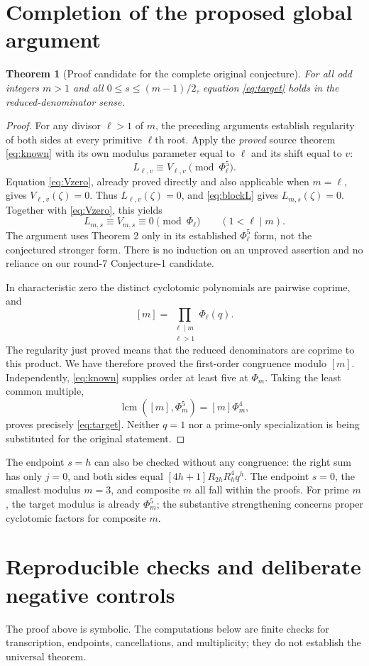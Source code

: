 \documentclass[11pt,a4paper]{article}
\newtheorem{theorem}{Theorem}[section]
\newcommand{\ph}{\Phi}\newcommand{\ord}{\operatorname{ord}}
\begin{document}
\section{Completion of the proposed global argument}
\begin{theorem}[Proof candidate for the complete original conjecture]
For all odd integers $m>1$ and all $0\leq s\leq(m-1)/2$,
equation \eqref{eq:target} holds in the reduced-denominator sense.
\end{theorem}
\begin{proof}
For any divisor $\ell>1$ of $m$, the preceding arguments establish
regularity of both sides at every primitive $\ell$th root.
Apply the \emph{proved} source theorem \eqref{eq:known} with its own
modulus parameter equal to $\ell$ and its shift equal to $v$:
\[
 L_{\ell,v}\equiv V_{\ell,v}\pmod{\ph_\ell^5}.
\]
Equation \eqref{eq:Vzero}, already proved directly and also applicable
when $m=\ell$, gives $V_{\ell,v}(\zeta)=0$. Thus
$L_{\ell,v}(\zeta)=0$, and \eqref{eq:blockL} gives
$L_{m,s}(\zeta)=0$. Together with \eqref{eq:Vzero}, this yields
\[
 L_{m,s}\equiv V_{m,s}\equiv0\pmod{\ph_\ell}
 \qquad(1<\ell\mid m).
\]
The argument uses Theorem 2 only in its established $\ph_\ell^5$ form,
not the conjectured stronger form. There is no induction on an unproved
assertion and no reliance on our round-7 Conjecture-1 candidate.

In characteristic zero the distinct cyclotomic polynomials are pairwise
coprime, and
\[
 [m]=\prod_{\substack{\ell\mid m\\\ell>1}}\ph_\ell(q).
\]
The regularity just proved means that the reduced denominators are
coprime to this product. We have therefore proved the first-order
congruence modulo $[m]$. Independently, \eqref{eq:known} supplies
order at least five at $\ph_m$. Taking the least common multiple,
\[
 \operatorname{lcm}([m],\ph_m^5)=[m]\ph_m^4,
\]
proves precisely \eqref{eq:target}. Neither $q=1$ nor a prime-only
specialization is being substituted for the original statement.
\end{proof}

The endpoint $s=h$ can also be checked without any congruence: the right
sum has only $j=0$, and both sides equal
$[4h+1]R_{2h}R_h^4q^h$. The endpoint $s=0$, the smallest modulus $m=3$,
and composite $m$ all fall within the proofs. For prime $m$, the target
modulus is already $\ph_m^5$; the substantive strengthening concerns
proper cyclotomic factors for composite $m$.

\section{Reproducible checks and deliberate negative controls}
The proof above is symbolic. The computations below are finite checks
for transcription, endpoints, cancellations, and multiplicity; they do
not establish the universal theorem.
\end{document}
